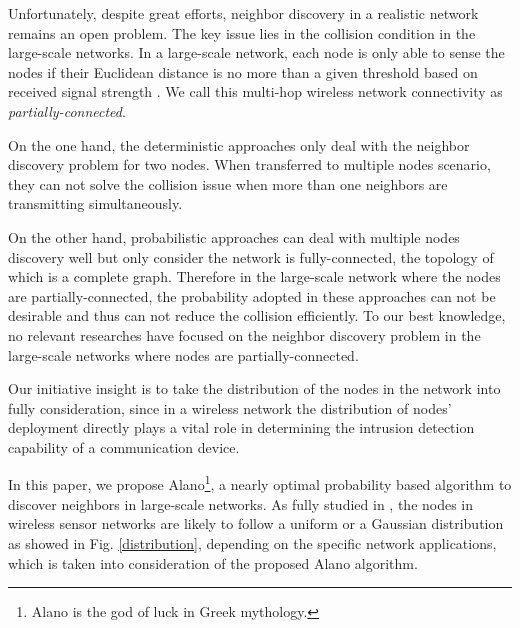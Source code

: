 Unfortunately, despite great efforts, neighbor discovery in a realistic network remains an open problem.
The key issue lies in the collision condition in the large-scale networks.
In a large-scale network, each node is only able to sense the 
nodes if their Euclidean distance is no more than a given threshold 
based on received signal strength \cite{moscibroda2006complexity, wang2013gaussian, wang2015connectivity}.  
We call this multi-hop wireless network connectivity as \emph{partially-connected}.


On the one hand, the deterministic approaches only deal with the neighbor discovery problem for two nodes.
When transferred to multiple nodes scenario, they can not solve the collision issue when more 
than one neighbors are transmitting simultaneously. 


On the other hand, probabilistic approaches can deal with multiple nodes discovery well but only consider
the network is fully-connected, the topology of which is a complete graph. 
Therefore in the large-scale network where the nodes are partially-connected,  
the probability adopted in these approaches can not be desirable 
and thus can not reduce the collision efficiently. 
To our best knowledge, no relevant researches 
have focused on the neighbor discovery problem in the large-scale networks 
where nodes are partially-connected.


Our initiative insight is to take the distribution of the nodes in the network
into fully consideration, since in a wireless network the distribution of 
nodes' deployment directly plays a vital role in determining the intrusion 
detection capability of a communication device.

In this paper, we propose Alano\footnote{Alano is the god of luck in Greek mythology.}, 
a nearly optimal probability based algorithm to discover neighbors in large-scale networks. 
As fully studied in \cite{wang2013gaussian} , the nodes in wireless sensor networks are likely to 
follow a uniform or a Gaussian distribution as showed in Fig. \ref{distribution}, 
depending on the specific network applications, which is taken into consideration of the proposed Alano algorithm.

